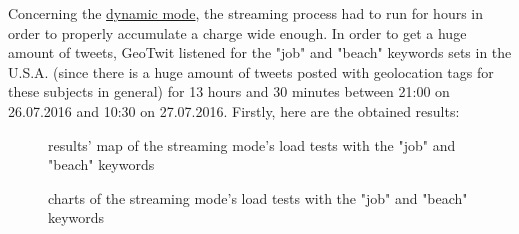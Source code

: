 \documentclass[a4paper,11pt]{report}
\begin{document}
\begin{enumerate}
	Concerning the \underline{dynamic mode}, the streaming process had to run for hours in order to properly accumulate a charge wide enough. In order to get a huge amount of tweets, GeoTwit listened for the "job" and "beach" keywords sets in the U.S.A. (since there is a huge amount of tweets posted with geolocation tags for these subjects in general) for 13 hours and 30 minutes between 21:00 on 26.07.2016 and 10:30 on 27.07.2016. Firstly, here are the obtained results:
	\begin{figure}[H]
	\vspace{-5pt}
	\begin{center}
	\vspace{-5pt}
	\caption{results' map of the streaming mode's load tests with the "job" and "beach" keywords}
	\end{center}
	\end{figure}
	\vspace{-10pt}
	
	\begin{figure}[H]
	\vspace{-5pt}
	\begin{center}
	\vspace{-5pt}
	\caption{charts of the streaming mode's load tests with the "job" and "beach" keywords}
	\end{center}
	\end{figure}
	\vspace{-10pt}	
	

\end{enumerate}
\end{document}

